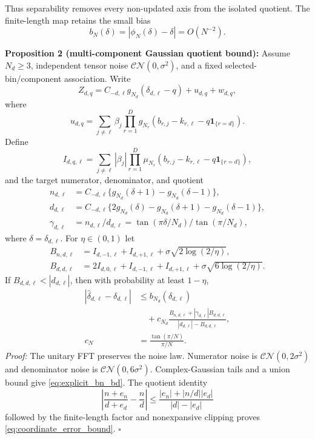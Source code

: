 Thus separability removes every non-updated axis from the isolated quotient. The finite-length map retains the small bias
\begin{equation}
 b_N(\delta)=|\phi_N(\delta)-\delta|=O(N^{-2}).
 \label{eq:candan_finite_bias}
\end{equation}

\textbf{Proposition 2 (multi-component Gaussian quotient bound):}
Assume $N_d\geq3$, independent tensor noise $\mathcal{CN}(0,\sigma^2)$, and a fixed selected-bin/component association. Write
\begin{equation}
 Z_{d,q}=C_{-d,\ell}g_{N_d}(\delta_{d,\ell}-q)+u_{d,q}+w_{d,q},
 \label{eq:triplet_signal_interference_noise}
\end{equation}
where
\begin{equation}
 u_{d,q}=\sum_{j\ne\ell}\beta_j\prod_{r=1}^{D}g_{N_r}
 (b_{r,j}-k_{r,\ell}-q\mathbf 1_{\{r=d\}}).
\end{equation}
Define
\begin{equation}
 I_{d,q,\ell}=\sum_{j\ne\ell}|\beta_j|\prod_{r=1}^{D}\mu_{N_r}
 (b_{r,j}-k_{r,\ell}-q\mathbf 1_{\{r=d\}}),
 \label{eq:interference_envelope}
\end{equation}
and the target numerator, denominator, and quotient
\begin{align}
 n_{d,\ell}&=C_{-d,\ell}\{g_{N_d}(\delta+1)-g_{N_d}(\delta-1)\},\nonumber\\
 d_{d,\ell}&=C_{-d,\ell}\{2g_{N_d}(\delta)-g_{N_d}(\delta+1)-g_{N_d}(\delta-1)\},\nonumber\\
 \gamma_{d,\ell}&=n_{d,\ell}/d_{d,\ell}
 =\tan(\pi\delta/N_d)/\tan(\pi/N_d),
 \label{eq:target_num_den}
\end{align}
where $\delta=\delta_{d,\ell}$. For $\eta\in(0,1)$ let
\begin{align}
 B_{n,d,\ell}&=I_{d,-1,\ell}+I_{d,+1,\ell}
 +\sigma\sqrt{2\log(2/\eta)},\nonumber\\
 B_{d,d,\ell}&=2I_{d,0,\ell}+I_{d,-1,\ell}+I_{d,+1,\ell}
 +\sigma\sqrt{6\log(2/\eta)}.
 \label{eq:explicit_bn_bd}
\end{align}
If $B_{d,d,\ell}<|d_{d,\ell}|$, then with probability at least $1-\eta$,
\begin{equation}
\begin{aligned}
 |\widehat\delta_{d,\ell}-\delta_{d,\ell}|
 &\le b_{N_d}(\delta_{d,\ell})\\
 &\quad+c_{N_d}\frac{B_{n,d,\ell}+|\gamma_{d,\ell}|B_{d,d,\ell}}
 {|d_{d,\ell}|-B_{d,d,\ell}},\\[-1mm]
 c_N&=\frac{\tan(\pi/N)}{\pi/N}.
\end{aligned}
 \label{eq:coordinate_error_bound}
\end{equation}
\emph{Proof:} The unitary FFT preserves the noise law. Numerator noise is $\mathcal{CN}(0,2\sigma^2)$ and denominator noise is $\mathcal{CN}(0,6\sigma^2)$. Complex-Gaussian tails and a union bound give \eqref{eq:explicit_bn_bd}. The quotient identity
\begin{equation*}
 \left|\frac{n+e_n}{d+e_d}-\frac nd\right|
 \le\frac{|e_n|+|n/d||e_d|}{|d|-|e_d|}
\end{equation*}
followed by the finite-length factor and nonexpansive clipping proves \eqref{eq:coordinate_error_bound}. \hfill$\square$

